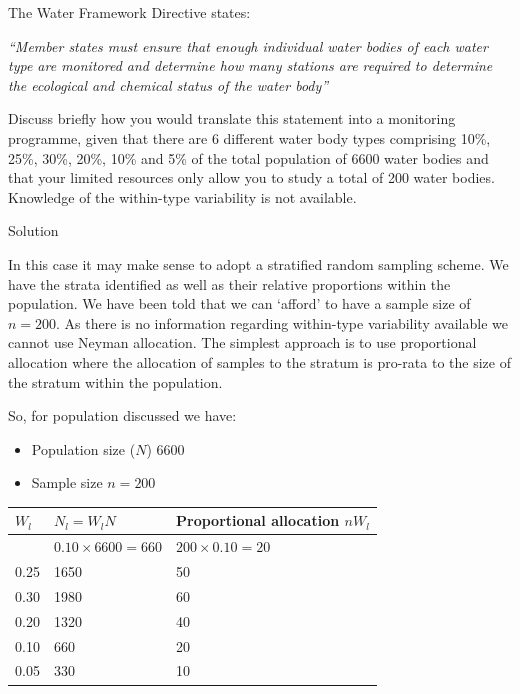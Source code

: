 \documentclass[
  letterpaper,
  DIV=11,
  numbers=noendperiod,
  oneside]{scrartcl}
\providecommand{\tightlist}{%
  \setlength{\itemsep}{0pt}\setlength{\parskip}{0pt}}\usepackage{longtable,booktabs,array}
\begin{document}
\begin{tcolorbox}[enhanced jigsaw, bottomrule=.15mm, breakable, bottomtitle=1mm, colback=white, titlerule=0mm, colbacktitle=quarto-callout-tip-color!10!white, rightrule=.15mm, toptitle=1mm, left=2mm, opacityback=0, toprule=.15mm, arc=.35mm, title={Task 10}, colframe=quarto-callout-tip-color-frame, coltitle=black, leftrule=.75mm, opacitybacktitle=0.6]

The Water Framework Directive states:

\emph{``Member states must ensure that enough individual water bodies of
each water type are monitored and determine how many stations are
required to determine the ecological and chemical status of the water
body''}

Discuss briefly how you would translate this statement into a monitoring
programme, given that there are 6 different water body types comprising
10\%, 25\%, 30\%, 20\%, 10\% and 5\% of the total population of 6600
water bodies and that your limited resources only allow you to study a
total of 200 water bodies. Knowledge of the within-type variability is
not available.

Solution

In this case it may make sense to adopt a stratified random sampling
scheme. We have the strata identified as well as their relative
proportions within the population. We have been told that we can
`afford' to have a sample size of \(n=200\). As there is no information
regarding within-type variability available we cannot use Neyman
allocation. The simplest approach is to use proportional allocation
where the allocation of samples to the stratum is pro-rata to the size
of the stratum within the population.

So, for population discussed we have:

\begin{itemize}
\tightlist
\item
  Population size (\(N\)) 6600
\item
  Sample size \(n =200\)
\end{itemize}

\begin{longtable}[]{@{}lll@{}}
\toprule\noalign{}
\(W_l\) & \(N_l = W_lN\) & Proportional allocation \(nW_l\) \\
\midrule\noalign{}
\endhead
\bottomrule\noalign{}
\endlastfoot
0.10 & \(0.10 \times 6600 = 660\) & \(200 \times 0.10 = 20\) \\
0.25 & 1650 & 50 \\
0.30 & 1980 & 60 \\
0.20 & 1320 & 40 \\
0.10 & 660 & 20 \\
0.05 & 330 & 10 \\
\end{longtable}

\end{tcolorbox}
\end{document}
